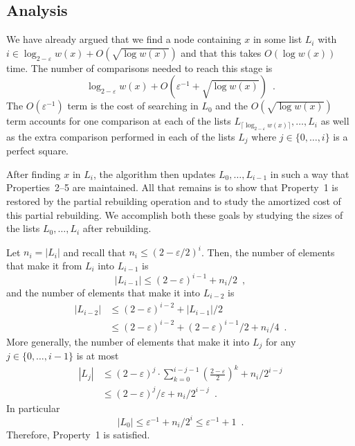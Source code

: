 \documentclass{patmorin}
\newcommand{\eps}{\varepsilon}
\begin{document}
\subsection{Analysis}

We have already argued that we find a node containing $x$ in some list
$L_i$ with $i\in \log_{2-\eps} w(x) + O(\sqrt{\log w(x)})$ and that this
takes $O(\log w(x))$ time.  The number of comparisons needed to reach
this stage is
\[
     \log_{2-\eps} w(x) + O\left(\eps^{-1} + \sqrt{\log w(x)}\right) \enspace .
\]
The $O(\eps^{-1})$ term is the cost of searching in $L_0$ and the
$O(\sqrt{\log w(x)})$ term accounts for one comparison at each of the lists
$L_{\lceil\log_{2-\eps} w(x)\rceil},\ldots,L_i$ as well as the extra
comparison performed in each of the lists $L_j$ where $j\in\{0,\ldots,i\}$
is a perfect square.

After finding $x$ in $L_i$, the algorithm then updates
$L_0,\ldots,L_{i-1}$ in such a way that Properties~2--5 are maintained.
All that remains is to show that Property~1 is restored by the partial
rebuilding operation and to study the amortized cost of this partial
rebuilding.  We accomplish both these goals by studying the sizes of the lists
$L_0,\ldots,L_i$ after rebuilding.

Let $n_i=|L_i|$ and recall that $n_i\le (2-\eps/2)^i$. Then,
the number of elements that make it from $L_i$ into $L_{i-1}$ is 
\[  |L_{i-1}| \le (2-\eps)^{i-1} + n_i/2 \enspace , \]
and the number of elements that make it into $L_{i-2}$ is
\begin{align*}
   |L_{i-2}| & \le (2-\eps)^{i-2} + |L_{i-1}|/2 \\
     & \le (2-\eps)^{i-2} + (2-\eps)^{i-1}/2 + n_i/4 \enspace . 
\end{align*}
More generally, the number of elements that make it into $L_j$ for any $j\in \{0,\ldots,i-1\}$ is at most
\begin{align*}
    |L_j| & \le (2-\eps)^{j} \cdot \sum_{k=0}^{i-j-1}\left(\frac{2-\eps}{2}\right)^k  + n_i/2^{i-j} \\
       & \le (2-\eps)^j/\eps + n_i/2^{i-j} \enspace .
\end{align*}
In particular
\[
    |L_0| \le \eps^{-1} + n_i/2^i \le \eps^{-1} + 1\enspace .
\]
Therefore, Property~1 is satisfied.
\end{document}
